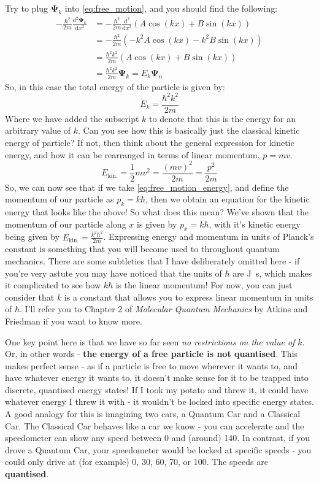 \documentclass{memoir}[11pt,oneside,a4paper,openany]
\newcommand{\wf}{\ensuremath{\bm{\Psi}}\xspace}
\begin{document}
Try to plug $\wf_k$ into \autoref{eq:free_motion}, and you should find the following:
\begin{align}
	-\frac{\hbar^2}{2m} \frac{\mathrm{d}^2\wf_k}{\mathrm{d}x^2} &= -\frac{\hbar^2}{2m} \frac{\mathrm{d}^2}{\mathrm{d}x^2}(A\cos(kx)+B\sin(kx)) \\ &= -\frac{\hbar^2}{2m}(-k^2 A\cos(kx) - k^2 B\sin(kx)) \\ &= \frac{\hbar^2k^2}{2m} (A\cos(kx) + B\sin(kx)) \\ &= \frac{\hbar^2k^2}{2m} \wf_k = E_k\wf_n
\end{align}
So, in this case the total energy of the particle is given by:
\begin{equation}\label{eq:free_motion_energy}
E_k = \frac{\hbar^2k^2}{2m}
\end{equation}
Where we have added the subscript $k$ to denote that this is the energy for an arbitrary value of $k$. Can you see how this is basically just the classical kinetic energy of particle? If not, then think about the general expression for kinetic energy, and how it can be rearranged in terms of linear momentum, $p=mv$.
\begin{equation}
	E_\mathrm{kin.} = \frac{1}{2}mv^2 = \frac{(mv)^2}{2m} = \frac{p^2}{2m}
\end{equation}
So, we can now see that if we take \autoref{eq:free_motion_energy}, and define the momentum of our particle as $p_k = k\hbar$, then we obtain an equation for the kinetic energy that looks like the above! So what does this mean? We've shown that the momentum of our particle along $x$ is given by $p_x = k\hbar$, with it's kinetic energy being given by $E_\mathrm{kin.} = \frac{k^2\hbar^2}{2m}$. Expressing energy and momentum in units of Planck's constant is something that you will become used to throughout quantum mechanics. There are some subtleties that I have deliberately omitted here - if you're very astute you may have noticed that the units of $\hbar$ are \si{\joule\second}, which makes it complicated to see how $k\hbar$ is the linear momentum! For now, you can just consider that $k$ is a constant that allows you to express linear momentum in units of $\hbar$. I'll refer you to Chapter 2 of \emph{Molecular Quantum Mechanics} by Atkins and Friedman if you want to know more. 

One key point here is that we have so far seen \emph{no restrictions on the value of $k$}. Or, in other words - \textbf{the energy of a free particle is not quantised}. This makes perfect sense - as if a particle is free to move wherever it wants to, and have whatever energy it wants to, it doesn't make sense for it to be trapped into discrete, quantised energy states! If I took my potato and threw it, it could have whatever energy I threw it with - it wouldn't be locked into specific energy states. A good analogy for this is imagining two cars, a Quantum Car and a Classical Car. The Classical Car behaves like a car we know - you can accelerate and the speedometer can show any speed between 0 and (around) \SI{140}{\mph}. In contrast, if you drove a Quantum Car, your speedometer would be locked at specific speeds - you could only drive at (for example) 0, 30, 60, 70, or \SI{100}{\mph}. The speeds are \textbf{quantised}.   
\end{document}
